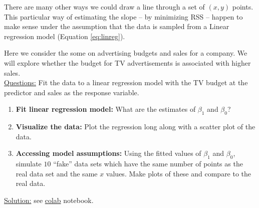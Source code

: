 There are many other ways we could draw a line through a set of $(x,y)$ points. This particular way of estimating the slope -- by minimizing RSS -- happen to make sense under the assumption that  the data is sampled from a Linear regression model (Equation \ref{eq:linreg}). 



\begin{example}
Here we consider the some on advertising budgets and sales for a company. We will explore whether the budget for TV advertisements is associated with higher sales. \\

 \noindent
\underline{Questions:} Fit the data to a linear regression model with the TV budget at the  predictor and sales as the response variable. 
\begin{enumerate}[label=(\alph*)]
\item {\bf Fit linear regression model:} What are the estimates of $\beta_1$ and $\beta_0$? 
\item {\bf Visualize the data:} Plot the regression long along with a scatter plot of the data. 
\item {\bf Accessing model assumptions:} Using the fitted values of $\beta_1$ and $\beta_0$, simulate $10$ ``fake'' data sets which have the same number of points as the real data set and the same $x$ values.  Make plots of these and compare to the real data.  \\
\end{enumerate}

 \noindent
\underline{Solution:} see \href{https://colab.research.google.com/drive/1_4zOruAWfJ3HQoIf9sjefk3z0APko94-?usp=sharing}{colab} notebook. 
\end{example}








